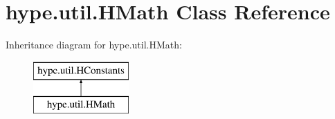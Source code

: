 \hypertarget{classhype_1_1util_1_1_h_math}{\section{hype.\-util.\-H\-Math Class Reference}
\label{classhype_1_1util_1_1_h_math}
}
Inheritance diagram for hype.\-util.\-H\-Math\-:\begin{figure}[H]
\begin{center}
\leavevmode
\includegraphics[height=2.000000cm]{classhype_1_1util_1_1_h_math}
\end{center}
\end{figure}
